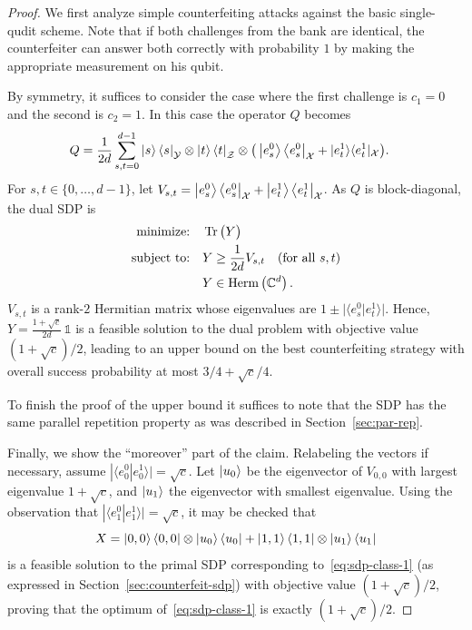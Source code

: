 \documentclass[11pt,letterpaper]{article}
\theoremstyle{definition}
\newcommand{\microspace}{\mspace{0.5mu}}
\newcommand{\tr}{\operatorname{Tr}}
\def\I{\mathbb{1}}
\newcommand{\setft}[1]{\mathrm{#1}}
\newcommand{\herm}[1]{\setft{Herm}\left(#1\right)}
\def\complex{\mathbb{C}}
\def \lket {\left|}
\def \rket {\right\rangle}
\def \lbra {\left\langle}
\def \rbra {\right|}
\newcommand{\ket}[1]{\lket\microspace #1 \microspace\rket}
\newcommand{\bra}[1]{\lbra\microspace #1 \microspace\rbra}
\def\X{\mathcal{X}}
\def\Y{\mathcal{Y}}
\def\Z{\mathcal{Z}}
\begin{document}
\begin{proof}
We first analyze simple counterfeiting attacks against the basic
single-qudit scheme. 
Note that if both challenges from the bank are identical, the
counterfeiter can answer both correctly with probability $1$ by making
the appropriate measurement on his qubit. 

By symmetry, it suffices to consider the case where the first
challenge is $c_1 = 0$ and the second is $c_2 = 1$. 
In this case the operator $Q$ becomes
\begin{align*}
 Q &= \frac{1}{2d}\sum_{s,t=0}^{d-1}  
 \ket{s}\bra{s}_{\Y} \otimes \ket{t}\bra{t}_{\Z}
 \otimes
 \big(\ket{e_s^0}\bra{e_s^0}_\X + |e_t^1\rangle\langle e_t^1|_\X\big). 
\end{align*}
For $s,t\in\{0,\ldots,d-1\}$, let $V_{s,t} =
\ket{e_s^0}\bra{e_s^0}_\X  + \ket{e_{t}^1}\bra{e_{t}^1}_\X $. As $Q$ is block-diagonal, the dual SDP is
    \begin{align}
      \text{minimize:}\quad & \tr\big(Y\big)\notag\\
      \text{subject to:}\quad & Y \geq \frac{1}{2d} V_{s,t}
      \quad\text{(for all $s,t$)}
      \label{eq:sdp-class-1}\\
      & Y\in\herm{\complex^d}.\notag
    \end{align}
$V_{s,t}$ is a rank-$2$ Hermitian matrix whose eigenvalues are
    $1\pm\big|\langle e_s^0|e_{t}^1 \rangle\big|$. 
Hence, $Y = \frac{1+\sqrt{c}}{2d}\,\I$ is a feasible solution to the
dual problem with objective value $(1+\sqrt{c})/2$, leading to an
upper bound on the best counterfeiting strategy with overall success
probability at most $3/4+\sqrt{c}/4$. 

To finish the proof of the upper bound it suffices to note that the
SDP has the same parallel repetition property as was described in
Section~\ref{sec:par-rep}.

Finally, we show the ``moreover'' part of the claim.
Relabeling the vectors if necessary, assume
$|\langle e_0^0 | e_0^1\rangle|=\sqrt{c}$.
Let $\ket{u_0}$ be the eigenvector of $V_{0,0}$ with largest eigenvalue
$1+\sqrt{c}$, and $\ket{u_1}$ the eigenvector with smallest
eigenvalue. 
Using the observation that
$|\langle e_1^0 | e_1^1\rangle|=\sqrt{c}$, it
may be checked that
$$X =  \ket{0,0}\bra{0,0}\otimes \ket{u_0}\bra{u_0} +
\ket{1,1}\bra{1,1}\otimes \ket{u_1}\bra{u_1}$$
is a feasible solution to the primal SDP corresponding
to~\eqref{eq:sdp-class-1} (as expressed in
Section~\ref{sec:counterfeit-sdp}) with objective value
$(1+\sqrt{c})/2$, proving that the optimum of~\eqref{eq:sdp-class-1}
is exactly $(1+\sqrt{c})/2$.
\end{proof}
\end{document}
